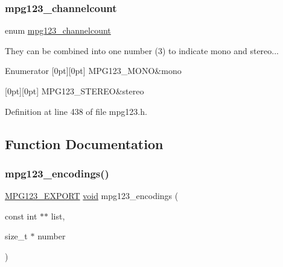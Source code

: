 \subsubsection{\texorpdfstring{mpg123\_channelcount}{mpg123\_channelcount}}
{\footnotesize\ttfamily enum \mbox{\hyperlink{group__mpg123__output_ga94df916cae2fc81b8a6df88c1728eb1c}{mpg123\+\_\+channelcount}}}

They can be combined into one number (3) to indicate mono and stereo... \begin{DoxyEnumFields}{Enumerator}
[0pt][0pt]{}\mbox{\label{group__mpg123__output_gga94df916cae2fc81b8a6df88c1728eb1ca5429c88158462f4290639ec505227c0c}} 
M\+P\+G123\+\_\+\+M\+O\+NO&mono \\
\hline

[0pt][0pt]{}\mbox{\label{group__mpg123__output_gga94df916cae2fc81b8a6df88c1728eb1ca52d7aff6b35da496e7f430b37c0d4602}} 
M\+P\+G123\+\_\+\+S\+T\+E\+R\+EO&stereo \\
\hline

\end{DoxyEnumFields}


Definition at line 438 of file mpg123.\+h.



\subsection{Function Documentation}
\mbox{\label{group__mpg123__output_gabdf7009c888364527de2bdf37aa36185}} 
\subsubsection{\texorpdfstring{mpg123\_encodings()}{mpg123\_encodings()}}
{\footnotesize\ttfamily \mbox{\hyperlink{mpg123_8h_a2ba98cfba3f760879df70e755b2a61cc}{M\+P\+G123\+\_\+\+E\+X\+P\+O\+RT}} \mbox{\hyperlink{_s_d_l__opengles2__gl2ext_8h_ae5d8fa23ad07c48bb609509eae494c95}{void}} mpg123\+\_\+encodings (\begin{DoxyParamCaption}\item[{const int $\ast$$\ast$}]{list,  }\item[{size\+\_\+t $\ast$}]{number }\end{DoxyParamCaption})}

